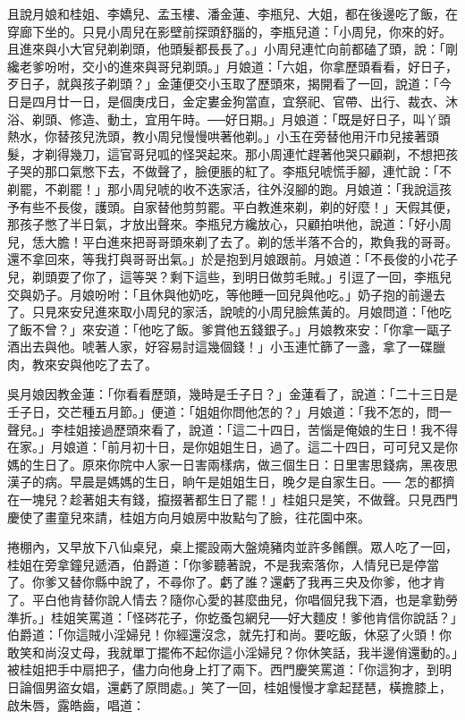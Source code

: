 且說月娘和桂姐、李嬌兒、孟玉樓、潘金蓮、李瓶兒、大姐，都在後邊吃了飯，在穿廊下坐的。只見小周兒在影壁前探頭舒腦的，李瓶兒道：「小周兒，你來的好。且進來與小大官兒剃剃頭，他頭髮都長長了。」小周兒連忙向前都磕了頭，說：「剛纔老爹吩咐，交小的進來與哥兒剃頭。」月娘道：「六姐，你拿歷頭看看，好日子，歹日子，就與孩子剃頭？」金蓮便交小玉取了歷頭來，揭開看了一回，說道：「今日是四月廿一日，是個庚戌日，金定婁金狗當直，宜祭祀、官帶、出行、裁衣、沐浴、剃頭、修造、動土，宜用午時。──好日期。」月娘道：「既是好日子，叫丫頭熱水，你替孩兒洗頭，教小周兒慢慢哄著他剃。」小玉在旁替他用汗巾兒接著頭髮，才剃得幾刀，這官哥兒呱的怪哭起來。那小周連忙趕著他哭只顧剃，不想把孩子哭的那口氣憋下去，不做聲了，臉便脹的紅了。李瓶兒唬慌手腳，連忙說：「不剃罷，不剃罷！」那小周兒唬的收不迭家活，往外沒腳的跑。月娘道：「我說這孩予有些不長俊，護頭。自家替他剪剪罷。平白教進來剃，剃的好麼！」天假其便，那孩子憋了半日氣，才放出聲來。李瓶兒方纔放心，只顧拍哄他，說道：「好小周兒，恁大膽！平白進來把哥哥頭來剃了去了。剃的恁半落不合的，欺負我的哥哥。還不拿回來，等我打與哥哥出氣。」於是抱到月娘跟前。月娘道：「不長俊的小花子兒，剃頭耍了你了，這等哭？剩下這些，到明日做剪毛賊。」引逗了一回，李瓶兒交與奶子。月娘吩咐：「且休與他奶吃，等他睡一回兒與他吃。」奶子抱的前邊去了。只見來安兒進來取小周兒的家活，說唬的小周兒臉焦黃的。月娘問道：「他吃了飯不曾？」來安道：「他吃了飯。爹賞他五錢銀子。」月娘教來安：「你拿一甌子酒出去與他。唬著人家，好容易討這幾個錢！」小玉連忙篩了一盞，拿了一碟臘肉，教來安與他吃了去了。

吳月娘因教金蓮：「你看看歷頭，幾時是壬子日？」金蓮看了，說道：「二十三日是壬子日，交芒種五月節。」便道：「姐姐你問他怎的？」月娘道：「我不怎的，問一聲兒。」李桂姐接過歷頭來看了，說道：「這二十四日，苦惱是俺娘的生日！我不得在家。」月娘道：「前月初十日，是你姐姐生日，過了。這二十四日，可可兒又是你媽的生日了。原來你院中人家一日害兩樣病，做三個生日：日里害思錢病，黑夜思漢子的病。早晨是媽媽的生日，晌午是姐姐生日，晚夕是自家生日。── 怎的都擠在一塊兒？趁著姐夫有錢，攛掇著都生日了罷！」桂姐只是笑，不做聲。只見西門慶使了畫童兒來請，桂姐方向月娘房中妝點勻了臉，往花園中來。

捲棚內，又早放下八仙桌兒，桌上擺設兩大盤燒豬肉並許多餚饌。眾人吃了一回，桂姐在旁拿鐘兒遞酒，伯爵道：「你爹聽著說，不是我索落你，人情兒已是停當了。你爹又替你縣中說了，不尋你了。虧了誰？還虧了我再三央及你爹，他才肯了。平白他肯替你說人情去？隨你心愛的甚麼曲兒，你唱個兒我下酒，也是拿勤勞準折。」桂姐笑罵道：「怪硶花子，你虼蚤包網兒──好大麵皮！爹他肯信你說話？」伯爵道：「你這賊小淫婦兒！你經還沒念，就先打和尚。要吃飯，休惡了火頭！你敢笑和尚沒丈母，我就單丁擺佈不起你這小淫婦兒？你休笑話，我半邊俏還動的。」被桂姐把手中扇把子，儘力向他身上打了兩下。西門慶笑罵道：「你這狗才，到明日論個男盜女娼，還虧了原問處。」笑了一回，桂姐慢慢才拿起琵琶，橫擔膝上，啟朱唇，露皓齒，唱道：

